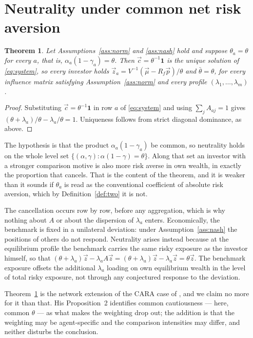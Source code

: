\documentclass[12pt]{article}
\newtheorem{theorem}{Theorem}
\theoremstyle{definition}
\theoremstyle{remark}
\newcommand{\bth}{\bar\theta}
\begin{document}
\section{Neutrality under common net risk aversion}
\label{sec:neutral}

\begin{theorem}
\label{thm:neutral}
Let Assumptions~\ref{ass:norm} and \ref{ass:nash} hold and suppose
$\theta_a=\theta$ for every $a$, that is, $\alpha_a(1-\gamma_a)=\theta$. Then $\vec c=\theta^{-1}\mathbf 1$ is the
unique solution of \eqref{eq:system}, so every investor holds
$\vec z_a=V^{-1}(\vec\mu-R_f\vec p)/\theta$ and $\bth=\theta$, for every influence
matrix satisfying Assumption~\ref{ass:norm} and every profile
$(\lambda_1,\dots,\lambda_m)$.
\end{theorem}

\begin{proof}
Substituting $\vec c=\theta^{-1}\mathbf 1$ in row $a$ of \eqref{eq:system} and
using $\sum_jA_{aj}=1$ gives
$(\theta+\lambda_a)/\theta-\lambda_a/\theta=1$. Uniqueness follows from strict
diagonal dominance, as above.
\end{proof}

The hypothesis is that the product $\alpha_a(1-\gamma_a)$ be common, so
neutrality holds on the whole level set
$\{(\alpha,\gamma):\alpha(1-\gamma)=\theta\}$. Along that set an investor with a
stronger comparison motive is also more risk averse in own wealth, in exactly
the proportion that cancels. That is the content of the theorem, and it is
weaker than it sounds if $\theta_a$ is read as the conventional coefficient of
absolute risk aversion, which by Definition~\ref{def:two} it is not.

The cancellation occurs row by row, before any aggregation, which is why
nothing about $A$ or about the dispersion of $\lambda_a$ enters. Economically, the
benchmark is fixed in a unilateral deviation: under Assumption~\ref{ass:nash}
the positions of others do not respond. Neutrality arises instead because at
the equilibrium profile the benchmark carries the same risky exposure as the
investor himself, so that
$(\theta+\lambda_a)\vec z-\lambda_aA\vec z=(\theta+\lambda_a)\vec z-\lambda_a\vec z=\theta\vec z$.
The benchmark exposure offsets the additional $\lambda_a$ loading on own
equilibrium wealth in the level of total risky exposure, not through any
conjectured response to the deviation.

Theorem~\ref{thm:neutral} is the network extension of the CARA case of
\cite{gomez}, and we claim no more for it than that. His Proposition~2
identifies common cautiousness --- here, common $\theta$ --- as what makes the
weighting drop out; the addition is that the weighting may be agent-specific
and the comparison intensities may differ, and neither disturbs the conclusion.
\end{document}

